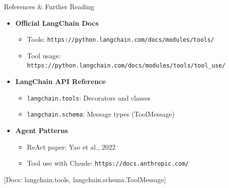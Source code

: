 \documentclass[aspectratio=169,11pt]{beamer}
\newcommand{\docref}[1]{{\scriptsize\color{docgray}[Docs: #1]}}
\begin{document}
\begin{frame}[fragile]{References \& Further Reading}
\begin{itemize}\setlength{\itemsep}{1pt}
  \item \textcolor{lcblue}{\textbf{Official LangChain Docs}}
    \begin{itemize}\setlength{\itemsep}{1pt}\small
      \item Tools: \texttt{https://python.langchain.com/docs/modules/tools/}
      \item Tool usage: \texttt{https://python.langchain.com/docs/modules/tools/tool\_use/}
    \end{itemize}

  \item \textcolor{lcblue}{\textbf{LangChain API Reference}}
    \begin{itemize}\setlength{\itemsep}{1pt}\small
      \item \texttt{langchain.tools}: Decorators and classes
      \item \texttt{langchain.schema}: Message types (ToolMessage)
    \end{itemize}

  \item \textcolor{lcblue}{\textbf{Agent Patterns}}
    \begin{itemize}\setlength{\itemsep}{1pt}\small
      \item ReAct paper: Yao et al., 2022
      \item Tool use with Claude: \texttt{https://docs.anthropic.com/}
    \end{itemize}
\end{itemize}

\docref{langchain.tools, langchain.schema.ToolMessage}
\end{frame}
\end{document}
